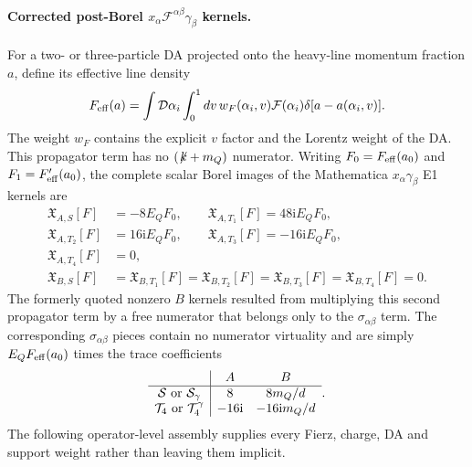 \documentclass[11pt]{article}
\newcommand{\ii}{\mathrm{i}}
\newcommand{\slashedk}{\not\!k}
\begin{document}
\paragraph{Corrected post-Borel
$x_\alpha\mathcal F^{\alpha\beta}\gamma_\beta$ kernels.}
For a two- or three-particle DA projected onto the heavy-line momentum
fraction $a$, define its effective line density
\begin{equation}
 F_{\rm eff}(a)=
 \int\mathcal D\alpha_i\int_0^1dv\,
 w_F(\alpha_i,v)\mathcal F(\alpha_i)
 \delta[a-a(\alpha_i,v)].
 \label{eq:effective-line-density}
\end{equation}
The weight $w_F$ contains the explicit $v$ factor and the Lorentz weight of
the DA.  This propagator term has no $(\slashedk+m_Q)$ numerator.
Writing $F_0=F_{\rm eff}(a_0)$ and
$F_1=F_{\rm eff}'(a_0)$, the complete scalar Borel images of the
Mathematica $x_\alpha\gamma_\beta$ E1 kernels are
\begin{align}
 \mathfrak X_{A,S}[F]&=-8E_QF_0,\qquad
 \mathfrak X_{A,T_1}[F]=48\ii E_QF_0,\nonumber\\
 \mathfrak X_{A,T_2}[F]&=16\ii E_QF_0,\qquad
 \mathfrak X_{A,T_3}[F]=-16\ii E_QF_0,\nonumber\\
 \mathfrak X_{A,T_4}[F]&=0,
 \label{eq:axial-xgamma-postborel}\\
 \mathfrak X_{B,S}[F]&=\mathfrak X_{B,T_1}[F]
 =\mathfrak X_{B,T_2}[F]=\mathfrak X_{B,T_3}[F]
 =\mathfrak X_{B,T_4}[F]=0 .
 \label{eq:tensor-xgamma-postborel}
\end{align}
The formerly quoted nonzero $B$ kernels resulted from multiplying this
second propagator term by a free numerator that belongs only to the
$\sigma_{\alpha\beta}$ term.  The corresponding
$\sigma_{\alpha\beta}$ pieces contain no numerator virtuality and are simply
$E_QF_{\rm eff}(a_0)$ times the trace coefficients
\begin{equation}
 \begin{array}{c|cc}
  &A&B\\ \hline
  \mathcal S\ {\rm or}\ \mathcal S_\gamma
    &8&8m_Q/d\\
  \mathcal T_4\ {\rm or}\ \mathcal T_4^\gamma
    &-16\ii&-16\ii m_Q/d
 \end{array}.
 \label{eq:sigma-postborel-coefficients}
\end{equation}
The following operator-level assembly supplies every Fierz, charge, DA and
support weight rather than leaving them implicit.
\end{document}
